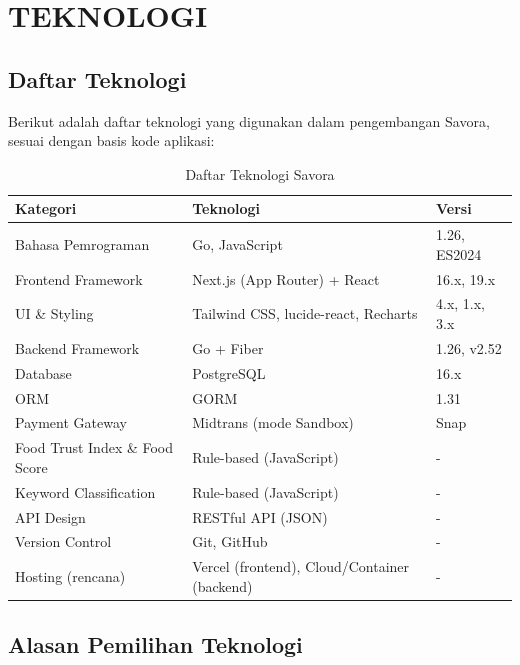 \section{TEKNOLOGI}

\subsection{Daftar Teknologi}

Berikut adalah daftar teknologi yang digunakan dalam pengembangan Savora, sesuai dengan basis
kode aplikasi:

\begin{table}[htbp]
\centering
\caption{Daftar Teknologi Savora}
\label{tab:daftar_teknologi}
\small
\begin{tabularx}{\textwidth}{|l|X|X|}
\hline
\textbf{Kategori} & \textbf{Teknologi} & \textbf{Versi} \\
\hline
Bahasa Pemrograman & Go, JavaScript & 1.26, ES2024 \\
\hline
Frontend Framework & Next.js (App Router) + React & 16.x, 19.x \\
\hline
UI \& Styling & Tailwind CSS, lucide-react, Recharts & 4.x, 1.x, 3.x \\
\hline
Backend Framework & Go + Fiber & 1.26, v2.52 \\
\hline
Database & PostgreSQL & 16.x \\
\hline
ORM & GORM & 1.31 \\
\hline
Payment Gateway & Midtrans (mode Sandbox) & Snap \\
\hline
Food Trust Index \& Food Score & Rule-based (JavaScript) & - \\
\hline
Keyword Classification & Rule-based (JavaScript) & - \\
\hline
API Design & RESTful API (JSON) & - \\
\hline
Version Control & Git, GitHub & - \\
\hline
Hosting (rencana) & Vercel (frontend), Cloud/Container (backend) & - \\
\hline
\end{tabularx}
\end{table}

\subsection{Alasan Pemilihan Teknologi}

